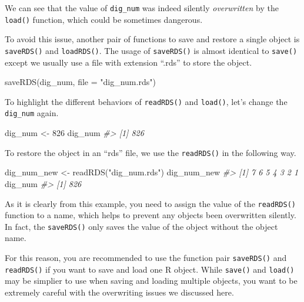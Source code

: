 \documentclass[
]{book}
\newenvironment{Shaded}{\begin{snugshade}}{\end{snugshade}}
\newcommand{\AttributeTok}[1]{\textcolor[rgb]{0.77,0.63,0.00}{#1}}
\newcommand{\CommentTok}[1]{\textcolor[rgb]{0.56,0.35,0.01}{\textit{#1}}}
\newcommand{\DecValTok}[1]{\textcolor[rgb]{0.00,0.00,0.81}{#1}}
\newcommand{\FunctionTok}[1]{\textcolor[rgb]{0.00,0.00,0.00}{#1}}
\newcommand{\NormalTok}[1]{#1}
\newcommand{\OtherTok}[1]{\textcolor[rgb]{0.56,0.35,0.01}{#1}}
\newcommand{\StringTok}[1]{\textcolor[rgb]{0.31,0.60,0.02}{#1}}
\begin{document}
We can see that the value of \texttt{dig\_num} was indeed silently \emph{overwritten} by the \texttt{load()} function, which could be sometimes dangerous.

To avoid this issue, another pair of functions to save and restore a single object is \texttt{saveRDS()} and \texttt{loadRDS()}. The usage of \texttt{saveRDS()} is almost identical to \texttt{save()} except we usually use a file with extension ``.rds'' to store the object.

\begin{Shaded}
\begin{Highlighting}[]
\FunctionTok{saveRDS}\NormalTok{(dig\_num, }\AttributeTok{file =} \StringTok{"dig\_num.rds"}\NormalTok{)}
\end{Highlighting}
\end{Shaded}

To highlight the different behaviors of \texttt{readRDS()} and \texttt{load()}, let's change the \texttt{dig\_num} again.

\begin{Shaded}
\begin{Highlighting}[]
\NormalTok{dig\_num }\OtherTok{\textless{}{-}} \DecValTok{826}
\NormalTok{dig\_num}
\CommentTok{\#\textgreater{} [1] 826}
\end{Highlighting}
\end{Shaded}

To restore the object in an ``rds'' file, we use the \texttt{readRDS()} in the following way.

\begin{Shaded}
\begin{Highlighting}[]
\NormalTok{dig\_num\_new }\OtherTok{\textless{}{-}} \FunctionTok{readRDS}\NormalTok{(}\StringTok{"dig\_num.rds"}\NormalTok{)}
\NormalTok{dig\_num\_new}
\CommentTok{\#\textgreater{} [1] 7 6 5 4 3 2 1}
\NormalTok{dig\_num}
\CommentTok{\#\textgreater{} [1] 826}
\end{Highlighting}
\end{Shaded}

As it is clearly from this example, you need to assign the value of the \texttt{readRDS()} function to a name, which helps to prevent any objects been overwritten silently. In fact, the \texttt{saveRDS()} only saves the value of the object without the object name.

For this reason, you are recommended to use the function pair \texttt{saveRDS()} and \texttt{readRDS()} if you want to save and load one R object. While \texttt{save()} and \texttt{load()} may be simplier to use when saving and loading multiple objects, you want to be extremely careful with the overwriting issues we discussed here.
\end{document}
